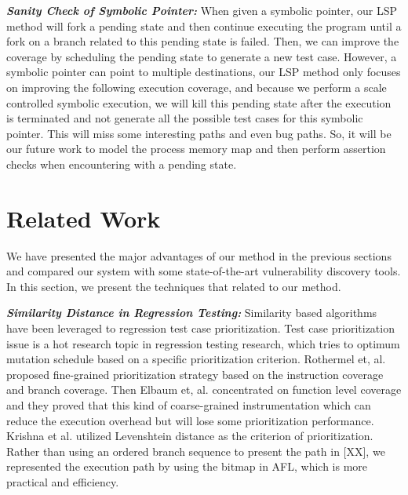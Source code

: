 \documentclass[a4paper]{article}
\begin{document}
\noindent\textit{\textbf{Sanity Check of Symbolic Pointer:}} When given a symbolic pointer, our LSP method will fork a pending state and then continue executing the program until a fork on a branch related to this pending state is failed. Then, we can improve the coverage by scheduling the pending state to generate a new test case. However, a symbolic pointer can point to multiple destinations, our LSP method only focuses on improving the following execution coverage, and because we perform a scale controlled symbolic execution, we will kill this pending state after the execution is terminated and not generate all the possible test cases for this symbolic pointer. This will miss some interesting paths and even bug paths. So, it will be our future work to model the process memory map and then perform assertion checks when encountering with a pending state.

\section{Related Work} \label{sec:related}
We have presented the major advantages of our method in the previous sections and compared our system with some state-of-the-art vulnerability discovery tools. In this section, we present the techniques that related to our method.

\noindent\textit{\textbf{Similarity Distance in Regression Testing:}}
Similarity based algorithms have been leveraged to regression test case prioritization. Test case prioritization issue is a hot research topic in regression testing research, which tries to optimum mutation schedule based on a specific prioritization criterion. Rothermel et, al. proposed fine-grained prioritization strategy based on the instruction coverage and branch coverage. Then Elbaum et, al. concentrated on function level coverage and they proved that this kind of coarse-grained instrumentation which can reduce the execution overhead but will lose some prioritization performance. Krishna et al. utilized Levenshtein distance as the criterion of prioritization. Rather than using an ordered branch sequence to present the path in [XX], we represented the execution path by using the bitmap in AFL, which is more practical and efficiency.
\end{document}
